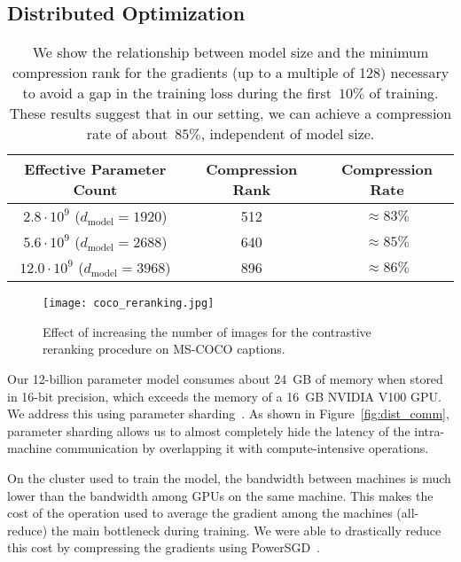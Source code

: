 \documentclass{article}
\begin{document}
\subsection{Distributed Optimization}
\label{sec:dist_opt}
\begin{table}[]
    \centering\scriptsize
    \begin{tabular}{ccc}
        \toprule
         Effective Parameter Count & Compression Rank & Compression Rate \\
         \midrule
         $2.8 \cdot 10^9$ ($d_{\mathrm{model}} = 1920$) & 512 & $\approx\! 83\%$ \\
         $5.6 \cdot 10^9$ ($d_{\mathrm{model}} = 2688$) & 640 & $\approx\! 85\%$ \\
         $12.0 \cdot 10^9$ ($d_{\mathrm{model}} = 3968$) & 896 & $\approx\! 86\%$ \\
         \bottomrule
    \end{tabular}
    \caption{We show the relationship between model size and the minimum compression rank for the gradients (up to a multiple of 128) necessary to avoid a gap in the training loss during the first~$10\%$ of training. These results suggest that in our setting, we can achieve a compression rate of about~$85\%$, independent of model size.}
    \label{tab:cmp_rank}
\end{table}
\begin{figure*}[t]
    \centering
    \texttt{[image: coco\_reranking.jpg]}
    \caption{Effect of increasing the number of images for the contrastive reranking procedure on MS-COCO captions.}
    \label{fig:coco_reranking}
\end{figure*}
Our 12-billion parameter model consumes about 24~GB of memory when stored in 16-bit precision, which exceeds the memory of a 16~GB NVIDIA V100 GPU. We address this using parameter sharding~\cite{rajbhandari2019zero}. As shown in Figure~\ref{fig:dist_comm}, parameter sharding allows us to almost completely hide the latency of the intra-machine communication by overlapping it with compute-intensive operations.

On the cluster used to train the model, the bandwidth between machines is much lower than the bandwidth among GPUs on the same machine. This makes the cost of the operation used to average the gradient among the machines (all-reduce) the main bottleneck during training. We were able to drastically reduce this cost by compressing the gradients using PowerSGD~\cite{vogels2019powersgd}.
\end{document}
